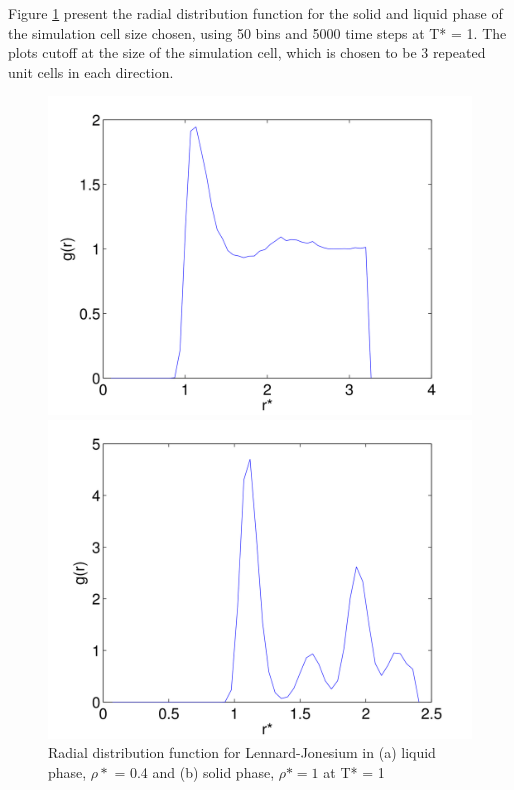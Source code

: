 \documentclass[12pt, oneside]{article}
\begin{document}
Figure \ref{fig:g(r)} present the radial distribution function for the solid and liquid phase of the simulation cell size chosen, using 50 bins and 5000 time steps at T* = 1. The plots cutoff at the size of the simulation cell, which is chosen to be 3 repeated unit cells in each direction.

\begin{figure}
\begin{minipage}[!htbp]{.5\linewidth}
\includegraphics[width=\textwidth]{./figs/ex10-gr-liq.png}
\subcaption{}
\end{minipage}
\hspace{0.02\linewidth}
\begin{minipage}[!htbp]{.5\linewidth}
\includegraphics[width=\textwidth]{./figs/ex10-gr-sol-rho1.png}
\subcaption{}
\end{minipage}
\caption{Radial distribution function for Lennard-Jonesium in (a) liquid phase, $\rho*$ = 0.4 and  (b) solid phase, $\rho* = 1$ at T* = 1}
\label{fig:g(r)}
\end{figure}
\end{document}
